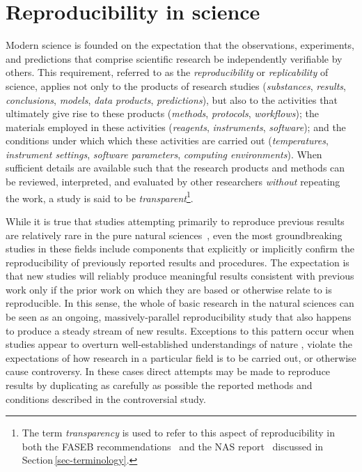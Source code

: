 \section{Reproducibility in science}\label{sec-reproducibility}

Modern science is founded on the expectation that the observations, experiments, and
	predictions that comprise scientific research be independently verifiable by others.
This requirement, referred to as the \emph{reproducibility} or \emph{replicability} of
	science, applies not only to the products of research studies (\emph{substances},
	\emph{results}, \emph{conclusions}, \emph{models}, \emph{data products},
	\emph{predictions}), but also to the activities that ultimately give rise to these
	products (\emph{methods}, \emph{protocols}, \emph{workflows}); the materials
	employed in these activities (\emph{reagents}, \emph{instruments},
	\emph{software}); and the conditions
	under which which these activities are carried out (\emph{temperatures},
	\emph{instrument settings}, \emph{software parameters},
	\emph{computing environments}).  When sufficient details are available
	such that the research products and methods can be reviewed, interpreted, and
	evaluated by other researchers \emph{without} repeating the work, a study is said to be
	\emph{transparent}\footnote{The term \emph{transparency} is used to refer
	to this aspect of reproducibility in both the FASEB recommendations~\cite{FASEB2016enhancing}
   and the NAS report~\cite{committeeonreproducibilityandreplicabilityinscience2019reproducibility}
	discussed in Section\,\ref{sec-terminology}.}.

While it is true that studies attempting primarily to reproduce previous results are relatively rare in the
	pure natural sciences~\cite{collins_changing_1985}, even the most groundbreaking studies in these fields include components
	that explicitly or implicitly confirm the reproducibility of previously reported results and procedures.
The expectation is that new studies will reliably produce meaningful results consistent with previous work
	only if the prior work on which they are based or otherwise relate to is reproducible.
In this sense, the whole of basic research in the natural sciences can be seen as an ongoing, massively-parallel
	reproducibility study that also happens to produce a steady stream of new results.
Exceptions to this pattern occur when studies appear to overturn
well-established understandings of nature \cite{kuhn1962structure},
	violate the expectations of how research in a particular field is to be carried out, or otherwise cause controversy.
In these cases direct attempts may be made to reproduce results by duplicating as carefully as possible
	the reported methods and conditions described in the controversial study.

